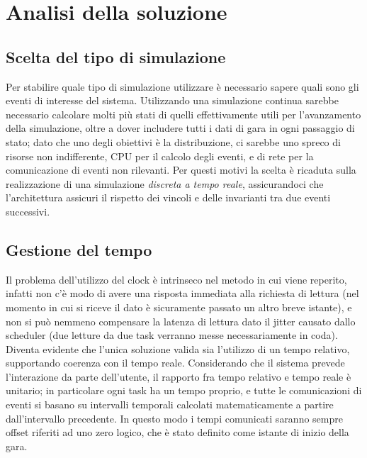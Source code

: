 \chapter{Analisi della soluzione} %

\label{Chapter3} %


\section{Scelta del tipo di simulazione}
Per stabilire quale tipo di simulazione utilizzare è necessario sapere quali sono gli eventi di interesse del sistema.
Utilizzando una simulazione continua sarebbe necessario calcolare molti più stati di quelli effettivamente utili per l’avanzamento della simulazione, oltre a dover includere tutti i dati di gara in ogni passaggio di stato; dato che uno degli obiettivi è la distribuzione, ci sarebbe uno spreco di risorse non indifferente, CPU per il calcolo degli eventi, e di rete per la comunicazione di eventi non rilevanti.
Per questi motivi la scelta è ricaduta sulla realizzazione di una simulazione \emph{discreta a tempo reale}, assicurandoci che l’architettura assicuri il rispetto dei vincoli e delle invarianti tra due eventi successivi.
\section{Gestione del tempo}
Il problema dell’utilizzo del clock è intrinseco nel metodo in cui viene reperito, infatti non c’è modo di avere una risposta immediata alla richiesta di lettura (nel momento in cui si riceve il dato è sicuramente passato un altro breve istante), e non si può nemmeno compensare la latenza di lettura dato il jitter causato dallo scheduler (due letture da due task verranno messe necessariamente in coda).
Diventa evidente che l’unica soluzione valida sia l’utilizzo di un tempo relativo, supportando coerenza con il tempo reale. Considerando che il sistema prevede l'interazione da parte dell'utente, il rapporto fra tempo relativo e tempo reale è unitario; in particolare ogni task ha un tempo proprio, e tutte le comunicazioni di eventi si basano su intervalli temporali calcolati matematicamente a partire dall’intervallo precedente. In questo modo i tempi comunicati saranno sempre offset riferiti ad uno zero logico, che è stato definito come istante di inizio della gara.

